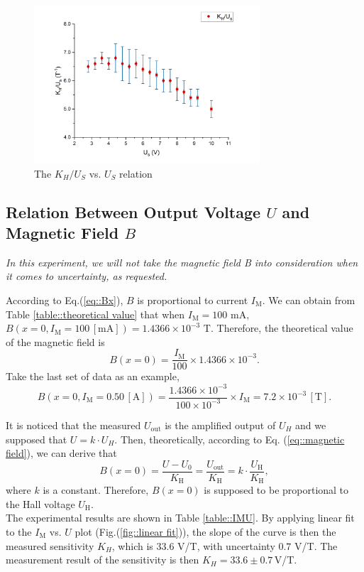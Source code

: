\documentclass[a4paper]{article}
\begin{document}
\begin{figure}[H]
	\centering
	\includegraphics[width=0.75\textwidth]{KHUS.png}
	\caption{The $K_H/U_S$ vs. $U_S$ relation}
	\label{fig::KHUS}
\end{figure}

\subsection{Relation Between Output Voltage $U$ and Magnetic Field $B$}\label{sec::e2}

\textit{In this experiment, we will not take the magnetic field B into consideration when it comes to uncertainty, as requested.}

According to Eq.(\ref{eq::Bx}), $B$ is proportional to current $I_\text{M}$. We can obtain from Table \ref{table::theoretical value} that when $I_\text{M} = 100 \,\,\text{mA},$ $B(x=0,I_\text{M}=100\,[\text{mA}])=1.4366\times10^{-3}\,\,\text{T}.$ Therefore,
the theoretical value of the magnetic field is $$B(x=0) = \frac{I_\text{M}}{100}\times 1.4366\times10^{-3}.$$
Take the last set of data as an example,
$$B(x=0,I_\text{M}=0.50\,[\text{A}]) = \frac{1.4366\times10^{-3}}{100\times 10^{-3}}\times I_\text{M} = 7.2\times 10^{-3}\,[\text{T}].$$

It is noticed that the measured $U_{\text{out}}$ is the amplified output of $U_{H}$ and we supposed that $U = k \cdot U_{H}$. Then, theoretically, according to Eq. (\ref{eq::magnetic field}), we can derive that
$$B(x=0) = \frac{U-U_0}{K_\text{H}} = \frac{U_{\text{out}}}{K_\text{H}} = k\cdot\frac{U_\text{H}}{K_\text{H}},$$
where $k$ is a constant. Therefore, $B(x=0)$ is supposed to be proportional to the Hall voltage $U_\text{H}$.\\

The experimental results are shown in Table \ref{table::IMU}. By applying linear fit to the $I_\text{M}$ vs. $U$ plot (Fig.(\ref{fig::linear fit})), the slope of the curve
is then the measured sensitivity $K_{H}$, which is $33.6$ V/T, with uncertainty $0.7$ V/T. The measurement result of the sensitivity is then
$K_H = 33.6 \pm 0.7\,$V/T.
\end{document}
